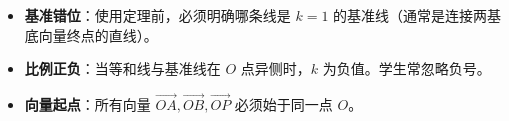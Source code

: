 \begin{trapbox}
\begin{itemize}
    \item \textbf{基准错位}：使用定理前，必须明确哪条线是 $k=1$ 的基准线（通常是连接两基底向量终点的直线）。
    \item \textbf{比例正负}：当等和线与基准线在 $O$ 点异侧时，$k$ 为负值。学生常忽略负号。
    \item \textbf{向量起点}：所有向量 $\vec{OA}, \vec{OB}, \vec{OP}$ 必须始于同一点 $O$。
\end{itemize}
\end{trapbox}